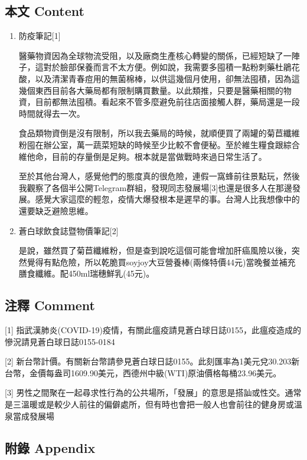 \documentclass[a5paper, 11pt
]{book}
\begin{document}
\hypertarget{ux672cux6587-content-33}{%
\subsection{本文 Content}\label{ux672cux6587-content-33}}

\begin{enumerate}
\def\labelenumi{\arabic{enumi}.}
\item
  防疫筆記{[}1{]}

  醫藥物資因為全球物流受阻，以及廠商生產核心轉變的關係，已經短缺了一陣子，這對於臉部保養而言不太方便。例如說，我需要多囤積一點粉刺藥杜鵑花酸，以及清潔青春痘用的無菌棉棒，以供這幾個月使用，卻無法囤積，因為這幾個東西目前各大藥局都有限制購買數量。以此類推，只要是醫藥相關的物資，目前都無法囤積。看起來不管多麼避免前往店面接觸人群，藥局還是一段時間就得去一次。

  食品類物資倒是沒有限制，所以我去藥局的時候，就順便買了兩罐的菊苣纖維粉囤在辦公室，萬一蔬菜短缺的時候至少比較不會便秘。至於維生糧食跟綜合維他命，目前的存量倒是足夠。根本就是當做戰時來過日常生活了。

  至於其他台灣人，感覺他們的態度真的很危險，連假一窩蜂前往景點玩，然後我觀察了各個半公開Telegram群組，發現同志發展場{[}3{]}也還是很多人在那邊發展。感覺大家這麼的輕忽，疫情大爆發根本是遲早的事。台灣人比我想像中的還要缺乏避險思維。
\item
  蒼白球飲食誌暨物價筆記{[}2{]}

  是說，雖然買了菊苣纖維粉，但是查到說吃這個可能會增加肝癌風險以後，突然覺得有點危險，所以乾脆買soyjoy大豆營養棒(兩條特價44元)當晚餐並補充膳食纖維。配450ml瑞穗鮮乳(45元)。
\end{enumerate}

\hypertarget{ux6ce8ux91cb-comment-33}{%
\subsection{注釋 Comment}\label{ux6ce8ux91cb-comment-33}}

{[}1{]}
指武漢肺炎(COVID-19)疫情，有關此瘟疫請見蒼白球日誌0155，此瘟疫造成的慘況請見蒼白球日誌0155-0184

{[}2{]}
新台幣計價。有關新台幣請參見蒼白球日誌0155。此刻匯率為1美元兌30.203新台幣，金價每盎司1609.90美元，西德州中級(WTI)原油價格每桶23.96美元。

{[}3{]}
男性之間聚在一起尋求性行為的公共場所，「發展」的意思是搭訕或性交。通常是三溫暖或是較少人前往的偏僻處所，但有時也會把一般人也會前往的健身房或溫泉當成發展場

\hypertarget{ux9644ux9304-appendix-33}{%
\subsection{附錄 Appendix}\label{ux9644ux9304-appendix-33}}
\end{document}

